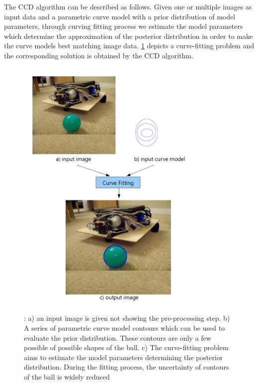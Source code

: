 The CCD algorithm can be described as follows. Given one or multiple images as input
data and a parametric curve model with a prior distribution of model
parameters, through curving fitting process we estimate the model
parameters which determine the approximation of the posterior
distribution in order to make the curve models best matching image data.
\ref{fig:fitting} depicts a curve-fitting problem and the
corresponding solution is obtained by the
CCD algorithm.
\begin{figure}[htb]
  \centering
  \includegraphics[width=10cm]{images/fitting.png}
  \caption[The description of curve-fitting problem]{: a) an input
    image is given not showing the pre-processing step. b) A series of
    parametric curve model contours which can be used to evaluate the
    prior distribution. These contours are only a few possible of
    possible shapes of the ball. c) The curve-fitting problem aims to estimate the model
    parameters determining the posterior distribution. During the
    fitting process, the uncertainty of contours of the ball is widely
    reduced}
  \label{fig:fitting}
\end{figure}



